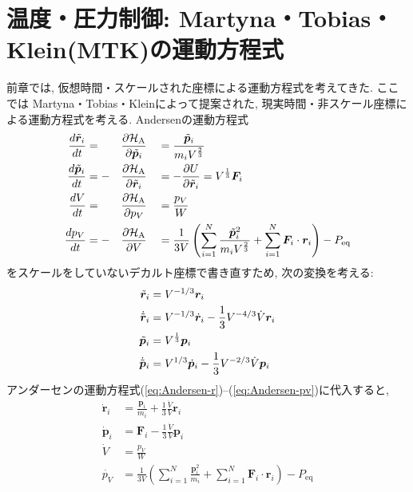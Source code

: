 \clearpage

\section{温度・圧力制御: Martyna・Tobias・Klein(MTK)の運動方程式}
前章では, 仮想時間・スケールされた座標による運動方程式を考えてきた.
ここでは Martyna・Tobias・Kleinによって提案された, 現実時間・非スケール座標による運動方程式を考える\cite{1994Martyna}.
Andersenの運動方程式
\begin{alignat}{3}
 \frac{d \Tilde{\bm{r}}_{i}}{d t}
  &= &&\frac{\partial \mathcal{H}_{\mathrm{A}}}{\partial \Tilde{\bm{p}}_{i}} &
  &= \frac{\Tilde{\bm{p}}_{i}}{m_{i} V^{\frac{2}{3}}}
 \label{eq:Andersen-r}
 \\
 \frac{d \Tilde{\bm{p}}_{i}}{d t}
  &= - &&\frac{\partial \mathcal{H}_{\mathrm{A}}}{\partial \Tilde{\bm{r}}_{i}}&
  &= - \frac{\partial U}{\partial \Tilde{\bm{r}}_{i}}
   =   V^{\frac{1}{3}} \bm{F}_{i}
 \label{eq:Andersen-p}
 \\
 \frac{d V}{d t}
  &= &&\frac{\partial \mathcal{H}_{\mathrm{A}}}{\partial p_{V}} &
 &= \frac{p_{V}}{W}
 \label{eq:Andersen-V}
 \\
 \frac{d p_{V}}{d t}
  &= - &&\frac{\partial \mathcal{H}_{\mathrm{A}}}{\partial V}  &
  &= \frac{1}{3V}
   \left(
         \sum_{i=1}^{N} \frac{\Tilde{\bm{p}}^{2}_{i}}{m_{i} V^{\frac{2}{3}}}
       + \sum_{i=1}^{N} \bm{F}_{i} \cdot \bm{r}_{i}
   \right)
   - P_{\mathrm{eq}}
 \label{eq:Andersen-pv}
\end{alignat}
をスケールをしていないデカルト座標で書き直すため, 次の変換を考える:
\begin{align}
 \Tilde{\bm{r}}_{i}       &= V^{-1/3} \bm{r}_{i} \\
 \dot{\Tilde{\bm{r}}}_{i} &= V^{-1/3} \dot{\bm{r}}_{i}
                           - \frac{1}{3} V^{-4/3} \dot{V} \bm{r}_{i} \\
 \Tilde{\bm{p}}_{i}       &= V^{\frac{1}{3}} \bm{p}_{i} \\
 \dot{\Tilde{\bm{p}}}_{i} &= V^{1/3} \dot{\bm{p}}_{i}
                           - \frac{1}{3} V^{-2/3} \dot{V} \bm{p}_{i}
\end{align}
アンダーセンの運動方程式(\ref{eq:Andersen-r})--(\ref{eq:Andersen-pv})に代入すると,
\begin{align}
 \dot{\bm{r}}_{i} &= \frac{\bm{p}_{i}}{m_{i}} + \frac{1}{3}\frac{\dot{V}}{V} \bm{r}_{i} \\
 \dot{\bm{p}}_{i} &= \bm{F}_{i} - \frac{1}{3}\frac{\dot{V}}{V} \bm{p}_{i} \\
 \dot{V}          &= \frac{p_{V}}{W} \\
 \dot{p_{V}}      &= \frac{1}{3V}
                     \left(
                             \sum_{i=1}^{N} \frac{\bm{p}^{2}_{i}}{m_{i}}
                           + \sum_{i=1}^{N} \bm{F}_{i} \cdot \bm{r}_{i}
                     \right)
                   - P_{\mathrm{eq}}
\end{align}

